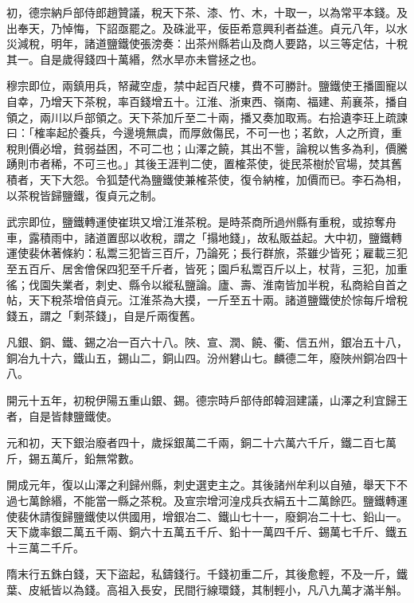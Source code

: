 \begin{pinyinscope}
 初，德宗納戶部侍郎趙贊議，稅天下茶、漆、竹、木，十取一，以為常平本錢。及出奉天，乃悼悔，下詔亟罷之。及硃泚平，佞臣希意興利者益進。貞元八年，以水災減稅，明年，諸道鹽鐵使張滂奏：出茶州縣若山及商人要路，以三等定估，十稅其一。自是歲得錢四十萬緡，然水旱亦未嘗拯之也。



 穆宗即位，兩鎮用兵，帑藏空虛，禁中起百尺樓，費不可勝計。鹽鐵使王播圖寵以自幸，乃增天下茶稅，率百錢增五十。江淮、浙東西、嶺南、福建、荊襄茶，播自領之，兩川以戶部領之。天下茶加斤至二十兩，播又奏加取焉。右拾遺李玨上疏諫曰：「榷率起於養兵，今邊境無虞，而厚斂傷民，不可一也；茗飲，人之所資，重稅則價必增，貧弱益困，不可二也；山澤之饒，其出不訾，論稅以售多為利，價騰踴則市者稀，不可三也。」其後王涯判二使，置榷茶使，徙民茶樹於官場，焚其舊積者，天下大怨。令狐楚代為鹽鐵使兼榷茶使，復令納榷，加價而已。李石為相，以茶稅皆歸鹽鐵，復貞元之制。



 武宗即位，鹽鐵轉運使崔珙又增江淮茶稅。是時茶商所過州縣有重稅，或掠奪舟車，露積雨中，諸道置邸以收稅，謂之「搨地錢」，故私販益起。大中初，鹽鐵轉運使裴休著條約：私鬻三犯皆三百斤，乃論死；長行群旅，茶雖少皆死；雇載三犯至五百斤、居舍儈保四犯至千斤者，皆死；園戶私鬻百斤以上，杖背，三犯，加重徭；伐園失業者，刺史、縣令以縱私鹽論。廬、壽、淮南皆加半稅，私商給自首之帖，天下稅茶增倍貞元。江淮茶為大摸，一斤至五十兩。諸道鹽鐵使於悰每斤增稅錢五，謂之「剩茶錢」，自是斤兩復舊。



 凡銀、銅、鐵、錫之冶一百六十八。陜、宣、潤、饒、衢、信五州，銀冶五十八，銅冶九十六，鐵山五，錫山二，銅山四。汾州礬山七。麟德二年，廢陜州銅冶四十八。



 開元十五年，初稅伊陽五重山銀、錫。德宗時戶部侍郎韓洄建議，山澤之利宜歸王者，自是皆隸鹽鐵使。



 元和初，天下銀治廢者四十，歲採銀萬二千兩，銅二十六萬六千斤，鐵二百七萬斤，錫五萬斤，鉛無常數。



 開成元年，復以山澤之利歸州縣，刺史選吏主之。其後諸州牟利以自殖，舉天下不過七萬餘緡，不能當一縣之茶稅。及宣宗增河湟戍兵衣絹五十二萬餘匹。鹽鐵轉運使裴休請復歸鹽鐵使以供國用，增銀冶二、鐵山七十一，廢銅冶二十七、鉛山一。天下歲率銀二萬五千兩、銅六十五萬五千斤、鉛十一萬四千斤、錫萬七千斤、鐵五十三萬二千斤。



 隋末行五銖白錢，天下盜起，私鑄錢行。千錢初重二斤，其後愈輕，不及一斤，鐵葉、皮紙皆以為錢。高祖入長安，民間行線環錢，其制輕小，凡八九萬才滿半斛。




\end{pinyinscope}
